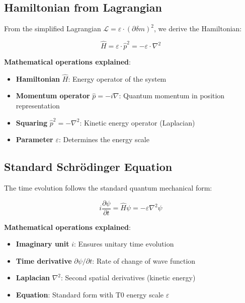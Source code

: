 \documentclass[12pt,a4paper]{article}
\newcommand{\deltam}{\delta m}
\newcommand{\Lag}{\mathcal{L}}
\theoremstyle{definition}
\theoremstyle{remark}
\begin{document}
	\subsection{Hamiltonian from Lagrangian}
	
	From the simplified Lagrangian $\Lag = \varepsilon \cdot (\partial \deltam)^2$, we derive the Hamiltonian:
	
	\begin{equation}
		\hat{H} = \varepsilon \cdot \hat{p}^2 = -\varepsilon \cdot \nabla^2
		\label{eq:simplified_hamiltonian}
	\end{equation}
	
	\textbf{Mathematical operations explained}:
	\begin{itemize}
		\item \textbf{Hamiltonian} $\hat{H}$: Energy operator of the system
		\item \textbf{Momentum operator} $\hat{p} = -i\nabla$: Quantum momentum in position representation
		\item \textbf{Squaring} $\hat{p}^2 = -\nabla^2$: Kinetic energy operator (Laplacian)
		\item \textbf{Parameter} $\varepsilon$: Determines the energy scale
	\end{itemize}
	
	\subsection{Standard Schrödinger Equation}
	
	The time evolution follows the standard quantum mechanical form:
	
	\begin{equation}
		i\frac{\partial\psi}{\partial t} = \hat{H}\psi = -\varepsilon \nabla^2 \psi
		\label{eq:standard_schrodinger_t0}
	\end{equation}
	
	\textbf{Mathematical operations explained}:
	\begin{itemize}
		\item \textbf{Imaginary unit} $i$: Ensures unitary time evolution
		\item \textbf{Time derivative} $\partial\psi/\partial t$: Rate of change of wave function
		\item \textbf{Laplacian} $\nabla^2$: Second spatial derivatives (kinetic energy)
		\item \textbf{Equation}: Standard form with T0 energy scale $\varepsilon$
	\end{itemize}
	
\end{document}
